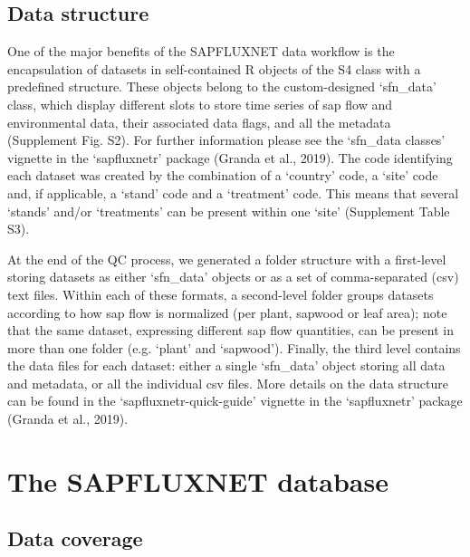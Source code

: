 \documentclass[11pt,twoside]{reedthesis}
\begin{document}
\subsection{Data structure}\label{data-structure}

One of the major benefits of the SAPFLUXNET data workflow is the
encapsulation of datasets in self-contained R objects of the S4 class
with a predefined structure. These objects belong to the custom-designed
`sfn\_data' class, which display different slots to store time series of
sap flow and environmental data, their associated data flags, and all
the metadata (Supplement Fig. S2). For further information please see
the `sfn\_data classes' vignette in the `sapfluxnetr' package (Granda et
al., 2019). The code identifying each dataset was created by the
combination of a `country' code, a `site' code and, if applicable, a
`stand' code and a `treatment' code. This means that several `stands'
and/or `treatments' can be present within one `site' (Supplement Table
S3).\par

At the end of the QC process, we generated a folder structure with a
first-level storing datasets as either `sfn\_data' objects or as a set
of comma-separated (csv) text files. Within each of these formats, a
second-level folder groups datasets according to how sap flow is
normalized (per plant, sapwood or leaf area); note that the same
dataset, expressing different sap flow quantities, can be present in
more than one folder (e.g. `plant' and `sapwood'). Finally, the third
level contains the data files for each dataset: either a single
`sfn\_data' object storing all data and metadata, or all the individual
csv files. More details on the data structure can be found in the
`sapfluxnetr-quick-guide' vignette in the `sapfluxnetr' package (Granda
et al., 2019).\par

\section{The SAPFLUXNET database}\label{the-sapfluxnet-database}

\subsection{Data coverage}\label{data-coverage}
\end{document}
